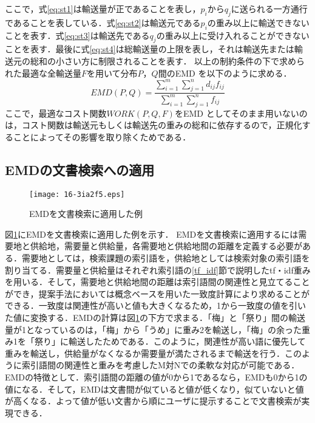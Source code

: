 \documentclass[japanese]{jnlp_1.4}
\begin{document}
ここで，式\ref{eq:st1}は輸送量が正であることを表し，$p_i$から$q_j$に送られる一方通行であることを表している．式\ref{eq:st2}は輸送元である$p_i$の重み以上に輸送できないことを表す．式\ref{eq:st3}は輸送先である$q_j$の重み以上に受け入れることができないことを表す．最後に式\ref{eq:st4}は総輸送量の上限を表し，それは輸送先または輸送元の総和の小さい方に制限されることを表す．
以上の制約条件の下で求められた最適な全輸送量$F$を用いて分布$P$，$Q$間のEMD を以下のように求める．
\begin{equation}
 EMD(P,Q)=\frac{\sum_{i=1}^m \sum_{j=1}^n d_{ij} f_{ij}}{\sum_{i=1}^m \sum_{j=1}^n f_{ij}}
\end{equation}
ここで，最適なコスト関数$WORK(P,Q,F)$をEMD としてそのまま用いないのは，コスト関数は輸送元もしくは輸送先の重みの総和に依存するので，正規化することによってその影響を取り除くためである． 


\subsection{EMDの文書検索への適用}

\begin{figure}[b]
\begin{center}
\texttt{[image: 16-3ia2f5.eps]}
\caption{EMDを文書検索に適用した例}
\label{fig:EMD_to_document}
\end{center}
\end{figure}

図\ref{fig:EMD_to_document}にEMDを文書検索に適用した例を示す．
EMDを文書検索に適用するには需要地と供給地，需要量と供給量，各需要地と供給地間の距離を定義する必要がある．需要地としては，検索課題の索引語を，供給地としては検索対象の索引語を割り当てる．需要量と供給量はそれぞれ索引語の\ref{tf_idf}節で説明したtf・idf重みを用いる．そして，需要地と供給地間の距離は索引語間の関連性と見立てることができ，提案手法においては概念ベースを用いた一致度計算により求めることができる．一致度は関連性が高いと値も大きくなるため，1から一致度の値を引いた値に変換する．EMDの計算は図\ref{fig:EMD_to_document}の下方で求まる．「梅」と「祭り」間の輸送量が1となっているのは，「梅」から「うめ」に重み2を輸送し，「梅」の余った重み1を「祭り」に輸送したためである．このように，関連性が高い語に優先して重みを輸送し，供給量がなくなるか需要量が満たされるまで輸送を行う．このように索引語間の関連性と重みを考慮したM対Nでの柔軟な対応が可能である．EMDの特徴として．索引語間の距離の値が0から1であるなら，EMDも0から1の値になる．そして，EMDは文書間が似ていると値が低くなり，似ていないと値が高くなる．よって値が低い文書から順にユーザに提示することで文書検索が実現できる．
\end{document}
